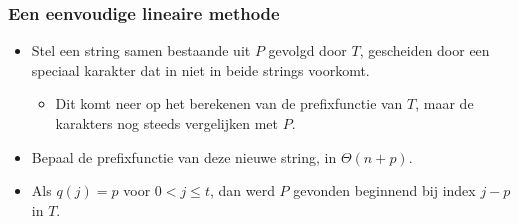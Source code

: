 \subsubsection{Een eenvoudige lineaire methode}
\begin{itemize}
    \item Stel een string samen bestaande uit $P$ gevolgd door $T$, gescheiden door een speciaal karakter dat in niet in beide strings voorkomt.
    \begin{itemize}
        \item Dit komt neer op het berekenen van de prefixfunctie van $T$, maar de karakters nog steeds vergelijken met $P$.
    \end{itemize}
    \item Bepaal de prefixfunctie van deze nieuwe string, in $\Theta(n + p)$.
    \item Als $q(j) = p$ voor $0 < j \leq t$, dan werd $P$ gevonden beginnend bij index $j - p$ in $T$.

    \begin{table}[ht]
        \centering
    \end{table}
\end{itemize}


